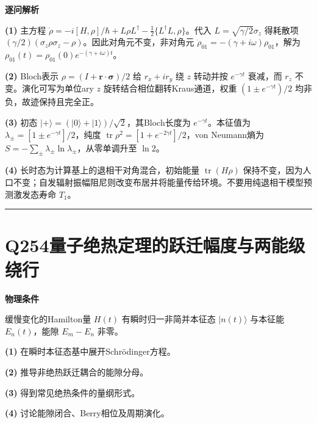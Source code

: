 \documentclass[UTF8,a4paper,11pt,oneside,openany]{ctexbook}
\begin{document}
\par\medskip\noindent\textbf{逐问解析}
\par\noindent\textbf{(1)} 主方程 \(\dot\rho=-i[H,\rho]/\hbar+L\rho L^\dagger-\tfrac12\{L^\dagger L,\rho\}\)。代入 \(L=\sqrt{\gamma/2}\sigma_z\) 得耗散项 \((\gamma/2)(\sigma_z\rho\sigma_z-\rho)\)。因此对角元不变，非对角元 \(\dot\rho_{01}=-(\gamma+i\omega)\rho_{01}\)，解为 \(\rho_{01}(t)=\rho_{01}(0)e^{-(\gamma+i\omega)t}\)。
\par\noindent\textbf{(2)} Bloch表示 \(\rho=(I+\boldsymbol r\cdot\boldsymbol\sigma)/2\) 给 \(r_x+ir_y\) 绕 \(z\) 转动并按 \(e^{-\gamma t}\) 衰减，而 \(r_z\) 不变。演化可写为单位ary \(z\) 旋转结合相位翻转Kraus通道，权重 \((1\pm e^{-\gamma t})/2\) 均非负，故迹保持且完全正。
\par\noindent\textbf{(3)} 初态 \(|+\rangle=(|0\rangle+|1\rangle)/\sqrt2\)，其Bloch长度为 \(e^{-\gamma t}\)。本征值为 \(\lambda_\pm=[1\pm e^{-\gamma t}]/2\)，纯度 \(\operatorname{tr}\rho^2=[1+e^{-2\gamma t}]/2\)，von Neumann熵为 \(S=-\sum_\pm\lambda_\pm\ln\lambda_\pm\)，从零单调升至 \(\ln2\)。
\par\noindent\textbf{(4)} 长时态为计算基上的退相干对角混合，初始能量 \(\operatorname{tr}(H\rho)\) 保持不变，因为人口不变；自发辐射振幅阻尼则改变布居并将能量传给环境。不要用纯退相干模型预测激发态寿命 \(T_1\)。

\par\bigskip\hrule\bigskip
\section*{Q254\quad 量子绝热定理的跃迁幅度与两能级绕行}
\textbf{物理条件}\par 缓慢变化的Hamilton量 \(H(t)\) 有瞬时归一非简并本征态 \(|n(t)\rangle\) 与本征能 \(E_n(t)\)，能隙 \(E_m-E_n\) 非零。
\par\noindent\textbf{(1)} 在瞬时本征态基中展开Schrödinger方程。
\par\noindent\textbf{(2)} 推导非绝热跃迁耦合的能隙分母。
\par\noindent\textbf{(3)} 得到常见绝热条件的量纲形式。
\par\noindent\textbf{(4)} 讨论能隙闭合、Berry相位及周期演化。
\end{document}
